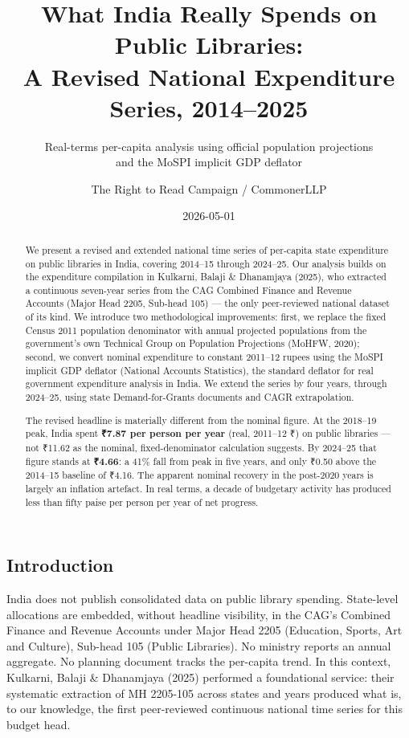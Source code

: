 \documentclass[
  11pt,
  oneside,
  10pt,
  a4paper,
  twocolumn]{article}
\title{What India Really Spends on Public Libraries:\\
A Revised National Expenditure Series, 2014--2025}
\subtitle{Real-terms per-capita analysis using official population
projections\\
and the MoSPI implicit GDP deflator}
\author{The Right to Read Campaign / CommonerLLP}
\date{2026-05-01}
\begin{document}
\maketitle
\begin{abstract}
We present a revised and extended national time series of per-capita
state expenditure on public libraries in India, covering 2014--15
through 2024--25. Our analysis builds on the expenditure compilation in
Kulkarni, Balaji \& Dhanamjaya (2025), who extracted a continuous
seven-year series from the CAG Combined Finance and Revenue Accounts
(Major Head 2205, Sub-head 105) --- the only peer-reviewed national
dataset of its kind. We introduce two methodological improvements:
first, we replace the fixed Census 2011 population denominator with
annual projected populations from the government's own Technical Group
on Population Projections (MoHFW, 2020); second, we convert nominal
expenditure to constant 2011--12 rupees using the MoSPI implicit GDP
deflator (National Accounts Statistics), the standard deflator for real
government expenditure analysis in India. We extend the series by four
years, through 2024--25, using state Demand-for-Grants documents and
CAGR extrapolation.

The revised headline is materially different from the nominal figure. At
the 2018--19 peak, India spent \textbf{₹7.87 per person per year} (real,
2011--12 ₹) on public libraries --- not ₹11.62 as the nominal,
fixed-denominator calculation suggests. By 2024--25 that figure stands
at \textbf{₹4.66}: a 41\% fall from peak in five years, and only ₹0.50
above the 2014--15 baseline of ₹4.16. The apparent nominal recovery in
the post-2020 years is largely an inflation artefact. In real terms, a
decade of budgetary activity has produced less than fifty paise per
person per year of net progress.
\end{abstract}


\subsection{Introduction}\label{introduction}

India does not publish consolidated data on public library spending.
State-level allocations are embedded, without headline visibility, in
the CAG's Combined Finance and Revenue Accounts under Major Head 2205
(Education, Sports, Art and Culture), Sub-head 105 (Public Libraries).
No ministry reports an annual aggregate. No planning document tracks the
per-capita trend. In this context, Kulkarni, Balaji \& Dhanamjaya (2025)
performed a foundational service: their systematic extraction of MH
2205-105 across states and years produced what is, to our knowledge, the
first peer-reviewed continuous national time series for this budget
head.
\end{document}

